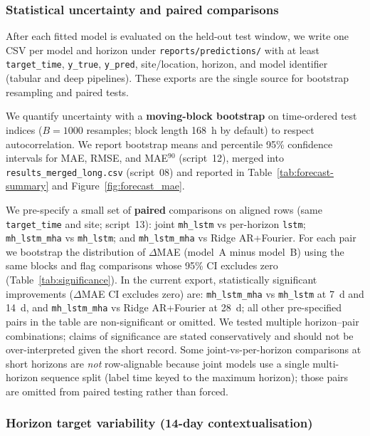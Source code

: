 \documentclass[a4paper,fleqn]{cas-sc}
\begin{document}
\subsubsection{Statistical uncertainty and paired comparisons}

After each fitted model is evaluated on the held-out test window, we write one CSV per model and horizon under \texttt{reports/predictions/} with at least \texttt{target\_time}, \texttt{y\_true}, \texttt{y\_pred}, site/location, horizon, and model identifier (tabular and deep pipelines). These exports are the single source for bootstrap resampling and paired tests.

We quantify uncertainty with a \textbf{moving-block bootstrap} on time-ordered test indices ($B{=}1000$ resamples; block length 168~h by default) to respect autocorrelation. We report bootstrap means and percentile 95\% confidence intervals for MAE, RMSE, and MAE$^{90}$ (script~12), merged into \texttt{results\_merged\_long.csv} (script~08) and reported in Table~\ref{tab:forecast-summary} and Figure~\ref{fig:forecast_mae}.

We pre-specify a small set of \textbf{paired} comparisons on aligned rows (same \texttt{target\_time} and site; script~13): joint \texttt{mh\_lstm} vs per-horizon \texttt{lstm}; \texttt{mh\_lstm\_mha} vs \texttt{mh\_lstm}; and \texttt{mh\_lstm\_mha} vs Ridge AR+Fourier. For each pair we bootstrap the distribution of $\Delta$MAE (model~A minus model~B) using the same blocks and flag comparisons whose 95\% CI excludes zero (Table~\ref{tab:significance}). In the current export, statistically significant improvements ($\Delta$MAE CI excludes zero) are: \texttt{mh\_lstm\_mha} vs \texttt{mh\_lstm} at 7~d and 14~d, and \texttt{mh\_lstm\_mha} vs Ridge AR+Fourier at 28~d; all other pre-specified pairs in the table are non-significant or omitted. We tested multiple horizon--pair combinations; claims of significance are stated conservatively and should not be over-interpreted given the short record. Some joint-vs-per-horizon comparisons at short horizons are \emph{not} row-alignable because joint models use a single multi-horizon sequence split (label time keyed to the maximum horizon); those pairs are omitted from paired testing rather than forced.

\subsubsection{Horizon target variability (14-day contextualisation)}
\end{document}
